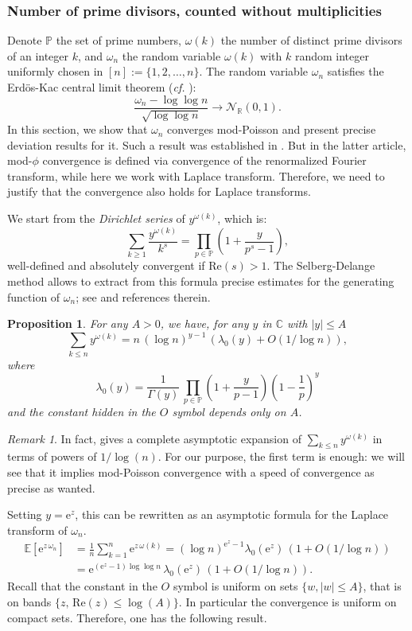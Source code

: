 \documentclass[12pt,a4paper,reqno]{amsart}
\newtheorem{proposition}[lemma]{Proposition}
\theoremstyle{remark}
\newtheorem{remark}[lemma]{Remark}
\newcommand{\R}{\mathbb{R}}
\newcommand{\C}{\mathbb{C}}
\newcommand{\E}{\mathrm{e}}
\newcommand{\esper}{\mathbb{E}}
\renewcommand{\Re}{\mathrm{Re}}
\begin{document}
\subsubsection{Number of prime divisors, counted without multiplicities}
Denote $\mathbb{P}$ the set of prime numbers, $\omega(k)$ the number of distinct prime divisors of an integer $k$, and $\omega_{n}$ the random variable $\omega(k)$ with $k$ random integer uniformly chosen in $[n]:=\{1,2,\ldots,n\}$. The random variable $\omega_{n}$ satisfies the Erd\"os-Kac central limit theorem (\emph{cf.} \cite{EK40}):
$$\frac{\omega_{n}-\log\log n}{\sqrt{\log\log n}} \to \mathcal{N}_{\R}(0,1).$$ 
In this section, we show that $\omega_{n}$ converges mod-Poisson and present precise deviation results for it. Such a result was established in \cite[Section 4]{KN10}. But in the latter article, mod-$\phi$ convergence is defined via convergence of the renormalized Fourier transform, while here we work with Laplace transform. Therefore, we need to justify that the convergence also holds for Laplace transforms.
\bigskip

We start from the {\em Dirichlet series} of $y^{\omega(k)}$, which is:
\[\sum_{k \ge 1} \frac{y^{\omega(k)}}{k^s} = \prod_{p \in \mathbb{P}} \left( 1 + \frac{y}{p^s-1} \right),\]
well-defined and absolutely convergent if $\Re(s)>1$. The Selberg-Delange method allows to extract from this formula precise estimates for the generating function of $\omega_{n}$; see \cite{Ten95} and references therein.

\begin{proposition}\cite[Section II.6, Theorem 1]{Ten95}
For any $A >0$, we have, for any $y$ in $\C$ with $|y| \le A$
\[ \sum_{k \le n} y^{\omega(k)} = n\, (\log n)^{y-1} \, (\lambda_0(y) +O(1/\log n)), \]
where
\[\lambda_0(y)= \frac{1}{\Gamma(y)} \, \prod_{p \in \mathbb{P}} \left( 1 + \frac{y}{p-1} \right)\left( 1- \frac{1}{p} \right)^y \]
and the constant hidden in the $O$ symbol depends only on $A$.
\label{prop:selbergdelange_omega}
\end{proposition}

\begin{remark}
In fact, \cite[Section II.6, Theorem 1]{Ten95} gives a complete asymptotic expansion of $\sum_{k \le n} y^{\omega(k)}$ in terms of powers of $1/\log(n)$. For our purpose, the first term is enough: we will see that it implies mod-Poisson convergence with a speed of convergence as precise as wanted.
\end{remark}
\bigskip

Setting $y=\E^z$, this can be rewritten as an asymptotic formula for the Laplace transform of $\omega_{n}$.
\begin{align*}
\esper[\E^{z\,\omega_{n}}] &= \frac{1}{n} \sum_{k=1}^n \E^{z\,\omega(k)} 
= (\log n)^{\E^z-1} \lambda_0(\E^z) \,(1+ O(1/\log n))\\
&= \E^{(\E^z-1) \log \log n}\, \lambda_0(\E^z) \,(1+ O(1/\log n)).
\end{align*}
Recall that the constant in the $O$ symbol is uniform on sets $\{w, |w| \le A\}$, that is on bands $\{z,\, \Re(z) \le \log(A)\}$. In particular the convergence is uniform on compact sets. Therefore, one has the following result.
\end{document}
